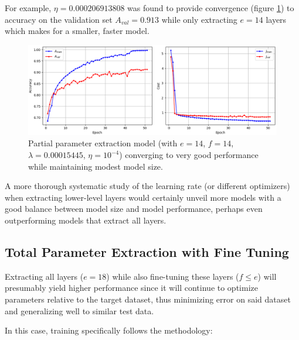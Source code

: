 For example, $\eta = 0.000206913808$ was found to provide convergence (figure \ref{fig:vgg16_partial_convergence}) to accuracy on the validation set $A_{val} = 0.913$ while only extracting $e = 14$ layers which makes for a smaller, faster model.

\begin{figure}[ht]
    \centering
    \includegraphics[width=1.0\textwidth]{figs/vgg16_partial_convergence.png}
    \caption{Partial parameter extraction model (with $e = 14$, $f = 14$, $\lambda = 0.00015445$, $\eta = 10^{-4}$) converging to very good performance while maintaining modest model size.}
    \label{fig:vgg16_partial_convergence}
\end{figure}

A more thorough systematic study of the learning rate (or different optimizers) when extracting lower-level layers would certainly unveil more models with a good balance between model size and model performance, perhaps even outperforming models that extract all layers.

\subsection{Total Parameter Extraction with Fine Tuning}
\label{section:total_parameter_extraction_with_fine_tuning}

Extracting all layers ($e = 18$) while also fine-tuning these layers ($f \leq e$) will presumably yield higher performance since it will continue to optimize parameters relative to the target dataset, thus minimizing error on said dataset and generalizing well to similar test data.

In this case, training specifically follows the methodology:

